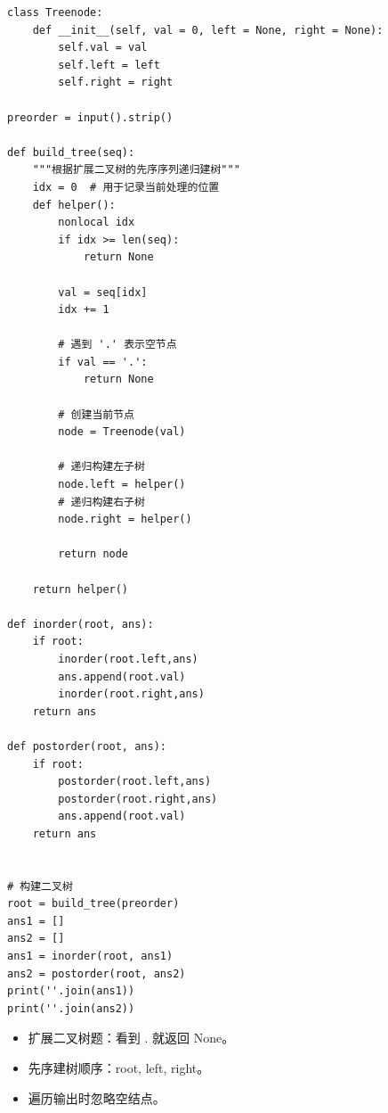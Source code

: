 \documentclass[10pt,a4paper,fontset=none]{ctexart}
\begin{document}
\begin{lstlisting}[style=py,caption={最终可用代码（对话来源）}]
class Treenode:
    def __init__(self, val = 0, left = None, right = None):
        self.val = val
        self.left = left
        self.right = right

preorder = input().strip()

def build_tree(seq):
    """根据扩展二叉树的先序序列递归建树"""
    idx = 0  # 用于记录当前处理的位置
    def helper():
        nonlocal idx
        if idx >= len(seq):
            return None

        val = seq[idx]
        idx += 1

        # 遇到 '.' 表示空节点
        if val == '.':
            return None

        # 创建当前节点
        node = Treenode(val)

        # 递归构建左子树
        node.left = helper()
        # 递归构建右子树
        node.right = helper()

        return node

    return helper()

def inorder(root, ans):
    if root:
        inorder(root.left,ans)
        ans.append(root.val)
        inorder(root.right,ans)
    return ans

def postorder(root, ans):
    if root:
        postorder(root.left,ans)
        postorder(root.right,ans)
        ans.append(root.val)
    return ans


# 构建二叉树
root = build_tree(preorder)
ans1 = []
ans2 = []
ans1 = inorder(root, ans1)
ans2 = postorder(root, ans2)
print(''.join(ans1))
print(''.join(ans2))

\end{lstlisting}
\begin{notebox}
\begin{itemize}
  \item 扩展二叉树题：看到 . 就返回 None。
  \item 先序建树顺序：root, left, right。
  \item 遍历输出时忽略空结点。
\end{itemize}
\end{notebox}
\end{document}
